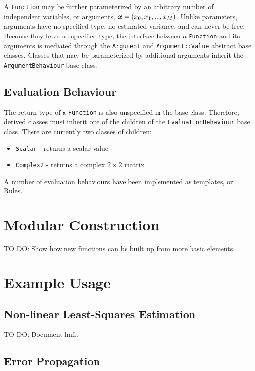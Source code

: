 \documentclass[12pt]{article}
\newcommand{\mbf}[1]{\mbox{\boldmath $#1$}}
\begin{document}
A {\tt Function} may be further parameterized by an arbitrary number of
independent variables, or arguments, ${\mbf x}=(x_0, x_1, ... , x_M)$.
Unlike parameters, arguments have no specified type, no estimated
variance, and can never be free.  Because they have no specified type,
the interface between a {\tt Function} and its arguments is mediated
through the {\tt Argument} and {\tt Argument::Value} abstract base
classes.  Classes that may be parameterized by additional arguments
inherit the {\tt ArgumentBehaviour} base class.

\subsection{Evaluation Behaviour}

The return type of a {\tt Function} is also unspecified in the base
class.  Therefore, derived classes must inherit one of the children of
the {\tt EvaluationBehaviour} base class.  There are currently two
classes of children:
\begin{itemize}
\item {\tt Scalar} - returns a scalar value
\item {\tt Complex2} - returns a complex $2\times2$ matrix
\end{itemize}
A number of evaluation behaviours have been implemented as
templates, or Rules.

\section{Modular Construction}

TO DO: Show how new functions can be built up from more basic elements.

\section{Example Usage}

\subsection{Non-linear Least-Squares Estimation}

TO DO: Document lmfit

\subsection{Error Propagation}
\end{document}
